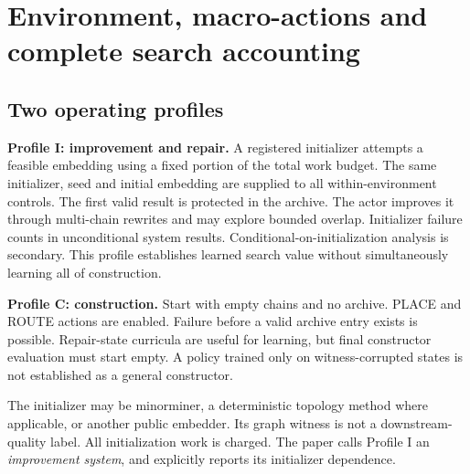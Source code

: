 \section{Environment, macro-actions and complete search accounting}\label{sec:system}
\subsection{Two operating profiles}
\textbf{Profile I: improvement and repair.} A registered initializer attempts a feasible embedding using a fixed portion of the total work budget. The same initializer, seed and initial embedding are supplied to all within-environment controls. The first valid result is protected in the archive. The actor improves it through multi-chain rewrites and may explore bounded overlap. Initializer failure counts in unconditional system results. Conditional-on-initialization analysis is secondary. This profile establishes learned search value without simultaneously learning all of construction.

\textbf{Profile C: construction.} Start with empty chains and no archive. PLACE and ROUTE actions are enabled. Failure before a valid archive entry exists is possible. Repair-state curricula are useful for learning, but final constructor evaluation must start empty. A policy trained only on witness-corrupted states is not established as a general constructor.

The initializer may be minorminer, a deterministic topology method where applicable, or another public embedder. Its graph witness is not a downstream-quality label. All initialization work is charged. The paper calls Profile I an \emph{improvement system}, and explicitly reports its initializer dependence.

